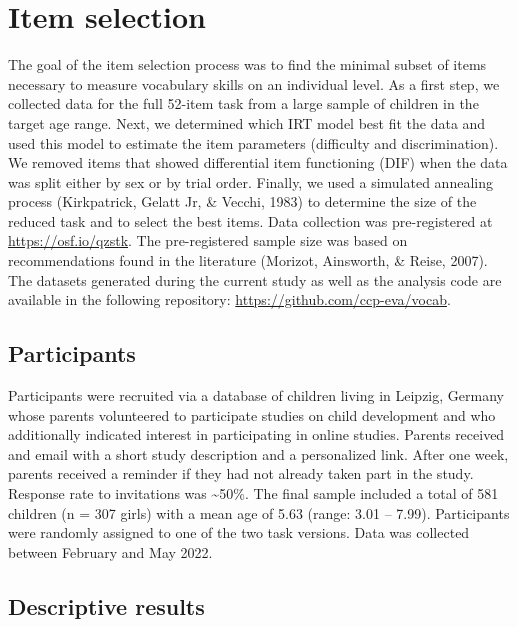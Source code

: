 \documentclass[
  man,floatsintext]{apa6}
\begin{document}
\hypertarget{item-selection}{%
\section{Item selection}\label{item-selection}}

The goal of the item selection process was to find the minimal subset of items necessary to measure vocabulary skills on an individual level. As a first step, we collected data for the full 52-item task from a large sample of children in the target age range. Next, we determined which IRT model best fit the data and used this model to estimate the item parameters (difficulty and discrimination). We removed items that showed differential item functioning (DIF) when the data was split either by sex or by trial order. Finally, we used a simulated annealing process (Kirkpatrick, Gelatt Jr, \& Vecchi, 1983) to determine the size of the reduced task and to select the best items. Data collection was pre-registered at \url{https://osf.io/qzstk}. The pre-registered sample size was based on recommendations found in the literature (Morizot, Ainsworth, \& Reise, 2007). The datasets generated during the current study as well as the analysis code are available in the following repository: \url{https://github.com/ccp-eva/vocab}.

\hypertarget{participants}{%
\subsection{Participants}\label{participants}}

Participants were recruited via a database of children living in Leipzig, Germany whose parents volunteered to participate studies on child development and who additionally indicated interest in participating in online studies. Parents received and email with a short study description and a personalized link. After one week, parents received a reminder if they had not already taken part in the study. Response rate to invitations was \textasciitilde50\%. The final sample included a total of 581 children (n = 307 girls) with a mean age of 5.63 (range: 3.01 -- 7.99). Participants were randomly assigned to one of the two task versions. Data was collected between February and May 2022.

\hypertarget{descriptive-results}{%
\subsection{Descriptive results}\label{descriptive-results}}
\end{document}

